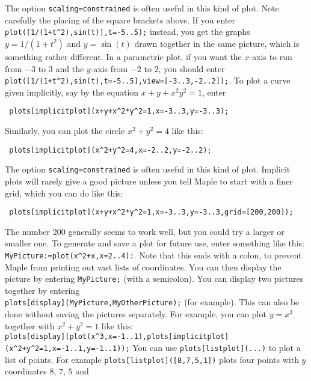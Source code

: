 \documentclass{amsart}
\begin{document}
\begin{itemize}
  The option \verb~scaling=constrained~ is often useful
  in this kind of plot.   
%
  Note carefully the placing of the square brackets above.  If
  you enter \verb~plot([1/(1+t^2),sin(t)],t=-5..5);~
  instead, you get the graphs $y=1/(1+t^2)$ and $y=\sin(t)$
  drawn together in the same picture, which is something
  rather different. 
%
  In a parametric plot, if you want the $x$-axis to run from $-3$
  to $3$ and  the $y$-axis from $-2$ to $2$, you should enter \\
  \verb~plot([1/(1+t^2),sin(t),t=-5..5],view=[-3..3,-2..2]);~. 
%
  To plot a curve given implicitly, say
  by the equation $x+y+x^2y^2=1$, enter 
\begin{verbatim}
 plots[implicitplot](x+y+x^2*y^2=1,x=-3..3,y=-3..3);
\end{verbatim}
  Similarly, you can plot the circle $x^2+y^2=4$ like this:
\begin{verbatim}
 plots[implicitplot](x^2+y^2=4,x=-2..2,y=-2..2);
\end{verbatim}
  The option \verb~scaling=constrained~ is often useful
  in this kind of plot. 
%
  Implicit plots will rarely give a good picture unless you
  tell Maple to start with a finer grid, which you can do like this:
\begin{verbatim}
 plots[implicitplot](x+y+x^2*y^2=1,x=-3..3,y=-3..3,grid=[200,200]);
\end{verbatim}
  The number 200 generally seems to work well, but you could
  try a larger or smaller one. 
%
  To generate and save a plot for future use, enter
  something like this: \\
  \verb~MyPicture:=plot(x^2+x,x=2..4):~.  Note that this 
  ends with a colon, to prevent Maple from printing out vast
  lists of coordinates.  You can then display the picture by
  entering \verb~MyPicture;~ (with a semicolon).  
%
  You can display two pictures together by entering \\
  \verb~plots[display](MyPicture,MyOtherPicture);~ (for 
  example).  This can also be done without saving the
  pictures separately.  For example, you can plot $y=x^3$
  together with $x^2+y^2=1$ like this:\\
  \verb~plots[display](plot(x^3,x=-1..1),plots[implicitplot](x^2+y^2=1,x=-1..1,y=-1..1));~
%
  You can use \verb~plots[listplot](...)~ to plot a list of
  points.  For example \verb~plots[listplot]([8,7,5,1])~
  plots four points with $y$ coordinates $8$, $7$, $5$ and

\end{itemize}
\end{document}
